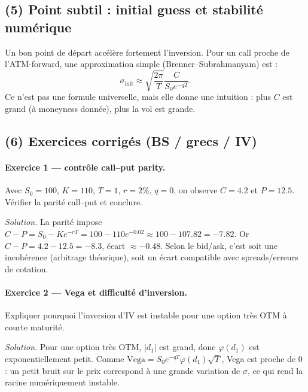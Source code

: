 \subsection*{(5) Point subtil : initial guess et stabilité numérique}
Un bon point de départ accélère fortement l'inversion.
Pour un call proche de l'ATM-forward, une approximation simple (Brenner--Subrahmanyam) est :
\[
\sigma_{\mathrm{init}}\approx \sqrt{\frac{2\pi}{T}}\frac{C}{S_0e^{-qT}}.
\]
Ce n'est pas une formule universelle, mais elle donne une intuition : plus $C$ est grand (à moneyness donnée), plus la vol est grande.

\subsection*{(6) Exercices corrigés (BS / grecs / IV)}
\paragraph{Exercice 1 --- contrôle call--put parity.}
Avec $S_0=100$, $K=110$, $T=1$, $r=2\%$, $q=0$, on observe $C=4.2$ et $P=12.5$.
Vérifier la parité call--put et conclure.

\emph{Solution.}
La parité impose $C-P=S_0-Ke^{-rT}=100-110e^{-0.02}\approx 100-107.82=-7.82$.
Or $C-P=4.2-12.5=-8.3$, écart $\approx -0.48$.
Selon le bid/ask, c'est soit une incohérence (arbitrage théorique), soit un écart compatible avec spreads/erreurs de cotation.

\paragraph{Exercice 2 --- Vega et difficulté d'inversion.}
Expliquer pourquoi l'inversion d'IV est instable pour une option très OTM à courte maturité.

\emph{Solution.}
Pour une option très OTM, $|d_1|$ est grand, donc $\varphi(d_1)$ est exponentiellement petit.
Comme $\mathrm{Vega}=S_0e^{-qT}\varphi(d_1)\sqrt{T}$, Vega est proche de 0 : un petit bruit sur le prix correspond à une grande variation de $\sigma$, ce qui rend la racine numériquement instable.
